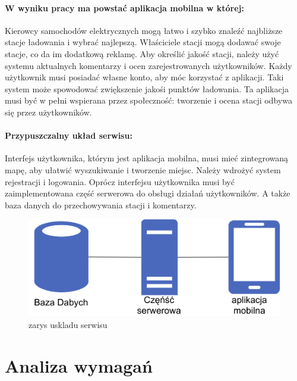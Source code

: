 \paragraph{W wyniku pracy ma powstać aplikacja mobilna w której:}
Kierowcy samochodów elektrycznych mogą łatwo i szybko znaleźć najbliższe stacje ładowania i wybrać najlepszą.
Właściciele stacji mogą dodawać swoje stacje, co da im dodatkową reklamę.
Aby określić jakość stacji, należy użyć systemu aktualnych komentarzy i ocen zarejestrowanych użytkowników.
Każdy użytkownik musi posiadać własne konto, aby móc korzystać z aplikacji.
Taki system może spowodować zwiększenie jakośi punktów ładowania.
Ta aplikacja musi być w pełni wspierana przez społeczność: tworzenie i ocena stacji odbywa się przez użytkowników.

\paragraph{Przypuszczalny układ serwisu:}
Interfejs użytkownika, którym jest aplikacja mobilna, musi mieć zintegrowaną mapę, aby ułatwić wyszukiwanie i tworzenie miejsc.
Należy wdrożyć system rejestracji i logowania.
Oprócz interfejsu użytkownika musi być zaimplementowana część serwerowa do obsługi działań użytkowników.
A także baza danych do przechowywania stacji i komentarzy.
\begin{figure}[ht]
    \centering
        \includegraphics[width=0.4\linewidth]{rys02/uklad_wstepny.png}
        \caption{zarys uskladu serwisu \cite{diagrams_net}}
    \label{fig:zarys uskladu serwisu }
\end{figure}\newline
\newpage
\section{Analiza wymagań}
